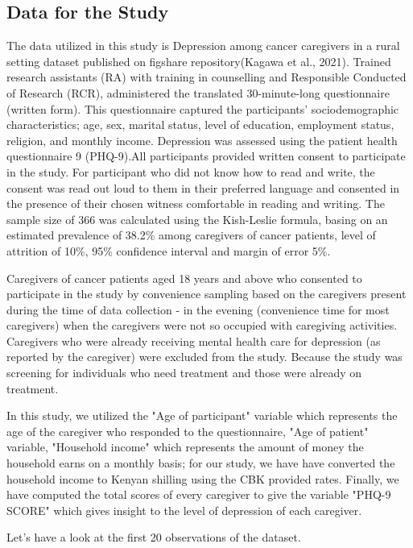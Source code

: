 \documentclass[12pt]{article}
\numberwithin{equation}{section}
\begin{document}
\subsection{Data for the Study}
The data utilized in this study is Depression among cancer caregivers in a rural setting dataset published on figshare repository(Kagawa et al., 2021). Trained research assistants (RA) with training in counselling and Responsible Conducted of Research (RCR), administered the translated 30-minute-long questionnaire (written form). This questionnaire captured the participants' sociodemographic characteristics; age, sex, marital status, level of education, employment status, religion, and monthly income. Depression was assessed using the patient health questionnaire 9 (PHQ-9).All participants provided written consent to participate in the study. For participant who did not know how to read and write, the consent was read out loud to them in their preferred language and consented in the presence of their chosen witness comfortable in reading and writing.
The sample size of 366 was calculated using the Kish-Leslie formula, basing on an estimated prevalence of 38.2\% among caregivers of cancer patients, level of attrition of 10\%, 95\% confidence interval and margin of error 5\%.

\noindent Caregivers of cancer patients aged 18 years and above who consented to participate in the study by convenience sampling based on the caregivers present during the time of data collection - in the evening (convenience time for most caregivers) when the caregivers were not so occupied with caregiving activities. Caregivers who were already receiving mental health care for depression (as reported by the caregiver) were excluded from the study. Because the study was screening for individuals who need treatment and those were already on treatment.

\noindent In this study, we utilized the "Age of participant" variable which represents the age of the caregiver who responded to the questionnaire, "Age of patient" variable, "Household income" which represents the amount of money the household earns on a monthly basis; for our study, we have have converted the household income to Kenyan shilling using the CBK provided rates. Finally, we have  computed the total scores of every caregiver to give the variable "PHQ-9 SCORE" which gives insight to the level of depression of each caregiver.

\noindent Let's have a look at the first 20 observations of the dataset.
\end{document}
